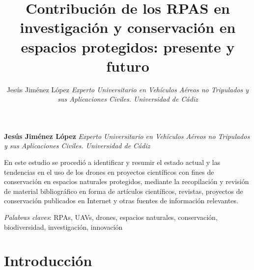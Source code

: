 \documentclass[11pt,]{article}
\title{Contribución de los RPAS en investigación y conservación en espacios
protegidos: presente y futuro  }
\author{\Large Jesús Jiménez López\vspace{0.05in} \newline\normalsize\emph{Experto Universitario en Vehículos Aéreos no Tripulados y sus
Aplicaciones Civiles. Universidad de Cádiz}  }
\date{}
\newcommand*{\authorfont}{\fontfamily{phv}\selectfont}
\renewenvironment{abstract}
 {{%
    \setlength{\leftmargin}{0mm}
    \setlength{\rightmargin}{\leftmargin}%
  }%
  \relax}
 {\endlist}
\begin{document}
	
%

{%
\setlength{\parindent}{0pt}
\thispagestyle{plain}
{\fontsize{18}{20}\selectfont\raggedright 
\maketitle  %

}

{
   \vskip 13.5pt\relax \normalsize\fontsize{11}{12} 
\textbf{\authorfont Jesús Jiménez López} \hskip 15pt \vskip 8.5pt  \emph{\small Experto Universitario en Vehículos Aéreos no Tripulados y sus
Aplicaciones Civiles. Universidad de Cádiz}   

}

}






\begin{abstract}

    \hbox{\vrule height .2pt width 39.14pc}

    \vskip 8.5pt %

\noindent En este estudio se procedió a identificar y resumir el estado actual y
las tendencias en el uso de los drones en proyectos científicos con
fines de conservación en espacios naturales protegidos, mediante la
recopilación y revisión de material bibliográfico en forma de artículos
científicos, revistas, proyectos de conservación publicados en Internet
y otras fuentes de información relevantes.


\vskip 8.5pt \noindent \emph{Palabras claves}: RPAs, UAVs, drones, espacios naturales, conservación, biodiversidad,
investigación, innovación \par

    \hbox{\vrule height .2pt width 39.14pc}



\end{abstract}


{
\hypersetup{linkcolor=black}
\setcounter{tocdepth}{2}
\tableofcontents
}


\vskip 6.5pt

\noindent \doublespacing \section{Introducción}\label{introduccion}
\end{document}
